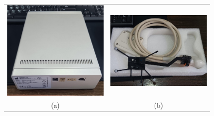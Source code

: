 \begin{figure}[h]
        \centering
	\begin{tabular}{ll}
		\includegraphics[scale=0.14]{bab3/usg_telemed.jpg}
		&
		\includegraphics[scale=0.12]{bab3/probe_linear.jpg} \\
		\multicolumn{1}{c}{(a)} & \multicolumn{1}{c}{(b)} 
		
	\end{tabular}
	

\end{figure}

